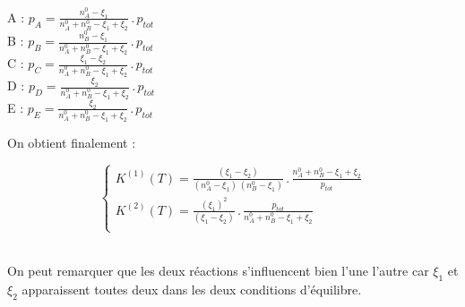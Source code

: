 \documentclass[fr]{../../../eplsummary}
\begin{document}
\begin{center}

A : $p_{A} = \frac{n^{0}_{A} - \xi_{1}}{n^{0}_{A} + n^{0}_{B} - \xi_{1} + \xi_{2}}\, . \, p_{tot}$\\
B : $p_{B} = \frac{n^{0}_{B} - \xi_{1}}{n^{0}_{A} + n^{0}_{B} - \xi_{1} + \xi_{2}}\, . \, p_{tot}$\\
C : $p_{C} = \frac{\xi_{1} - \xi_{2}}{n^{0}_{A} + n^{0}_{B} - \xi_{1} + \xi_{2}}\, . \, p_{tot}$\\
D : $p_{D} = \frac{\xi_{2}}{n^{0}_{A} + n^{0}_{B} - \xi_{1} + \xi_{2}}\, . \, p_{tot}$\\
E : $p_{E} = \frac{\xi_{2}}{n^{0}_{A} + n^{0}_{B} - \xi_{1} + \xi_{2}}\, . \, p_{tot}$

\par On obtient finalement : 

	\[ 
\left\{
	\begin{array}{l}
		K^{(1)}(T) = \frac{(\xi_{1} - \xi_{2})}{(n^{0}_{A} - \xi_{1})\,(n^{0}_{B} - \xi_{1})} \,.\, \frac{n^{0}_{A} + n^{0}_{B}-\xi_{1} + \xi_{2}}{p_{tot}}\\
		K^{(2)}(T) = \frac{(\xi_{1})^{2}}{(\xi_{1} - \xi_{2})}\, . \, \frac{p_{tot}}{n^{0}_{A} + n^{0}_{B}-\xi_{1} + \xi_{2}}\\

	\end{array}
	\right.
	\]	\\
	
\par On peut remarquer que les deux réactions s’influencent bien l’une l’autre car $\xi_{1}$ et $\xi_{2}$ apparaissent toutes deux dans les deux conditions d’équilibre.\\

\end{center}
\end{document}
